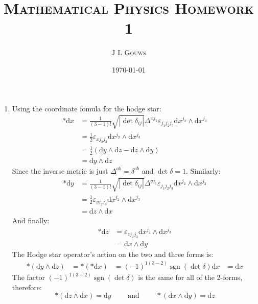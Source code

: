 \documentclass[12pt,a4]{article}
\title{
\textsc{Mathematical Physics Homework 1}
}
\author{\textsc{J L Gouws}
}
\date{\today
\\[1cm]}
\DeclareMathOperator{\sign}{sgn}
\newcommand{\e}{\mathrm{d}}
\begin{document}
\thispagestyle{empty}

\maketitle

\begin{enumerate}
  \item
    \begin{enumerate}
        Using the coordinate fomula for the hodge star:
        \begin{align*}
          * \e x &= \frac{1}{(3 - 1)!} \sqrt{|\det{\delta_{ij}}|} \Delta^{x j_1} \varepsilon_{j_1 j_2 j_3} \e x^{j_2} \wedge \e x^{j_3}\\
                 &= \frac{1}{2} \varepsilon_{x j_2 j_3} \e x^{j_2} \wedge \e x^{j_3}\\
                 &= \frac{1}{2} \left(\e y \wedge \e z - \e z \wedge \e y\right)\\
                 &= \e y \wedge \e z
        \end{align*}
        Since the inverse metric is just $\Delta^{ab} = \delta^{ab}$ and $\det \delta = 1$.
        Similarly:
        \begin{align*}
          * \e y &= \frac{1}{(3 - 1)!} \sqrt{|\det{\delta_{ij}}|} \Delta^{y j_1} \varepsilon_{j_1 j_2 j_3} \e x^{j_2} \wedge \e x^{j_3}\\
                 &= \frac{1}{2} \varepsilon_{y j_2 j_3} \e x^{j_2} \wedge \e x^{j_3}\\
                 &= \e z \wedge \e x
        \end{align*}
        And finally:
        \begin{align*}
          * \e z &= \varepsilon_{z j_2 j_3} \e x^{j_2} \wedge \e x^{j_3}\\
                 &= \e x \wedge \e y
        \end{align*}
        The Hodge star operator's action on the two and three forms is:
        \begin{align*}
          * (\e y \wedge \e z)
                  &= *(* \e x) 
                  &= (-1)^{1(3 - 2)}\sign(\det \delta) \e x
                  &= \e x
        \end{align*}
        The factor $(-1)^{1(3 - 2)}\sign(\det \delta)$ is the same for all of the 2-forms, therefore:
        \begin{equation*}
          *(\e z \wedge \e x) = \e y \qquad \text{ and } \qquad *(\e x \wedge \e y) = \e z
        \end{equation*}

\end{enumerate}
\end{enumerate}
\end{document}
